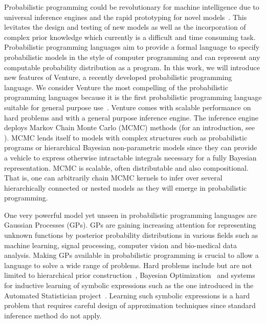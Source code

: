 Probabilistic programming could be revolutionary for machine intelligence due to universal inference engines and the rapid prototyping for novel models~\citep{ghahramani2015probabilistic}. This levitates the design and testing of new models as well as the incorporation of complex prior knowledge which currently is a difficult and time consuming task. Probabilistic programming languages aim to provide a formal language to specify probabilistic models in the style of computer programming and can represent any computable probability distribution as a program. In this work, we will introduce new features of Venture, a recently developed probabilistic programming language. We consider Venture the most compelling of the probabilistic programming languages because it is the first probabilistic programming language suitable for general purpose use~\citep{mansinghka2014venture}. Venture comes with scalable performance on hard problems and with a general purpose inference engine. The inference engine deploys Markov Chain Monte Carlo (MCMC) methods (for an introduction, see \citet*{andrieu2003introduction}). MCMC lends itself to models with complex structures such as probabilistic programs or hierarchical Bayesian non-parametric models since they can provide a vehicle to express otherwise intractable integrals necessary for a fully Bayesian representation. MCMC is scalable, often distributable and also compositional. That is, one can arbitrarily chain MCMC kernels to infer over several hierarchically connected or nested models as they will emerge in probabilistic programming.

One very powerful model yet unseen in probabilistic programming languages are Gaussian Processes (GPs). GPs are gaining increasing attention for representing unknown functions by posterior probability distributions in various fields such as machine learning, signal processing, computer vision and bio-medical data analysis. Making GPs available in probabilistic programming is crucial to allow a language to solve a wide range of problems. Hard problems include but are not limited to hierarchical prior construction~\citep{neal1997monte}, Bayesian Optimization~\cite{snoek2012practical} and systems for inductive learning of symbolic expressions such as the one introduced in the Automated Statistician project~\cite{duvenaud2013structure,lloyd2014automatic}. Learning such symbolic expressions is a hard problem that requires careful design of approximation techniques since standard inference method do not apply.


